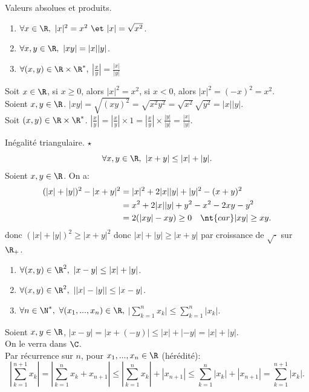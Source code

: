 \documentclass[11pt]{article}
\begin{document}
\begin{prop}{Valeurs absolues et produits.}{}
    \begin{enumerate}
        \item $\forall x\in\R,~|x|^2=x^2~\et~|x|=\sqrt{x^2}$.
        \item $\forall x,y \in \R,~|xy|=|x||y|$.
        \item $\forall (x,y)\in\R\times\R^*,~$\Large$\left|\frac{x}{y}\right|=\frac{|x|}{|y|}$
    \end{enumerate}
    \tcblower
     Soit $x\in\R$, si $x\geq0$, alors $|x|^2=x^2$, si $x<0$, alors $|x|^2=(-x)^2=x^2$.\\
     Soient $x,y\in\R$. $|xy|=\sqrt{(xy)^2}=\sqrt{x^2y^2}=\sqrt{x^2}\sqrt{y^2}=|x||y|$.\\
     Soit $(x,y)\in\R\times\R^*$. $\left|\frac{x}{y}\right|=\left|\frac{x}{y}\right|\times1=\left|\frac{x}{y}\right|\times\frac{|y|}{|y|}=\frac{|x|}{|y|}$.
\end{prop}

\vspace*{-0.5cm}

\begin{thm}{Inégalité triangulaire. $\star$}{}
    \begin{equation*}
        \forall x,y\in\R,~|x+y|\leq|x|+|y|.
    \end{equation*}
    \tcblower
    Soient $x,y\in\R$. On a:
    \begin{align*}
        (|x|+|y|)^2 - |x+y|^2 &= |x|^2+2|x||y|+|y|^2-(x+y)^2\\
        &= x^2 + 2|x||y| + y^2 - x^2 - 2xy - y^2\\
        &= 2(|xy|-xy)\geq 0 \quad \nt{car } |xy|\geq xy.
    \end{align*}
    donc $(|x|+|y|)^2\geq |x+y|^2$ donc $|x|+|y|\geq|x+y|$ par croissance de $\sqrt{\cdot}$ sur $\R_+$.
\end{thm}

\begin{corr}{}{}
    \begin{enumerate}
        \item $\forall (x,y)\in\R^2,~|x-y|\leq|x|+|y|$.
        \item $\forall (x,y)\in\R^2,~||x|-|y||\leq|x-y|$.
        \item $\forall n\in\N^*,~\forall (x_1,...,x_n)\in\R,~$\large$\Big|\sum\limits_{k=1}^nx_k\Big|\leq\sum\limits_{k=1}^n|x_k|$.
    \end{enumerate}
    \tcblower
     Soient $x,y\in\R$, $|x-y|=|x+(-y)|\leq|x|+|-y|=|x|+|y|$.\\
     On le verra dans $\C$.\\
     Par récurrence sur $n$, pour $x_1,...,x_n\in\R$ (hérédité):
    \begin{equation*}
        \left|\sum_{k=1}^{n+1}x_k\right|=\left|\sum_{k=1}^nx_k+x_{n+1}\right|\leq\left|\sum_{k=1}^nx_k\right|+|x_{n+1}|\leq\sum_{k=1}^n|x_k|+|x_{n+1}|=\sum_{k=1}^{n+1}|x_k|.
    \end{equation*}
\end{corr}
\end{document}
